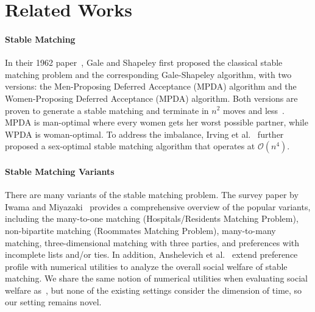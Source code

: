 \section{Related Works}
\paragraph{Stable Matching}
In their 1962 paper~\cite{galeshapley1962}, Gale and Shapeley first proposed the classical stable matching problem and the corresponding
Gale-Shapeley algorithm, with two versions: the Men-Proposing Deferred Acceptance (MPDA) algorithm and the Women-Proposing Deferred Acceptance (MPDA) algorithm. Both versions are proven to generate a stable matching and terminate in $n^2$ moves and less~\cite{irving1989textbook}. MPDA is man-optimal where every women gets her worst possible partner, while WPDA is woman-optimal. To address the imbalance, Irving et al.~\cite{irving1987efficient} further proposed a sex-optimal stable matching algorithm that operates at $\mathcal{O}(n^4)$.

\paragraph{Stable Matching Variants}
There are many variants of the stable matching problem. The survey paper by Iwama and Miyazaki~\cite{iwama2008survey} provides a comprehensive overview of the popular variants, including the many-to-one matching (Hospitals/Residents Matching Problem), non-bipartite matching (Roommates Matching Problem), many-to-many matching, three-dimensional matching with three parties, and preferences with incomplete lists and/or ties. In addition, Anshelevich et al.~\cite{Anshelevich2013} extend preference profile with numerical utilities to analyze the overall social welfare of stable matching. We share the same notion of numerical utilities when evaluating social welfare as~\cite{Anshelevich2013}, but none of the existing settings consider the dimension of time, so our setting remains novel.